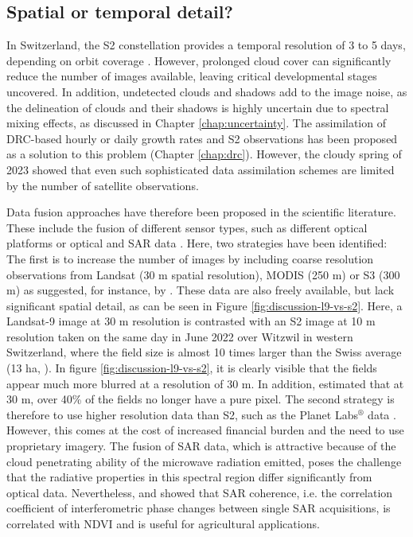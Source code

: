 \subsection{Spatial or temporal detail?}
In Switzerland, the \gls{S2} constellation provides a temporal resolution of 3 to 5 days, depending on orbit coverage \citep{pazur_national_2022}. However, prolonged cloud cover can significantly reduce the number of images available, leaving critical developmental stages uncovered. In addition, undetected clouds and shadows add to the image noise, as the delineation of clouds and their shadows is highly uncertain due to spectral mixing effects, as discussed in Chapter \ref{chap:uncertainty}. The assimilation of \gls{DRC}-based hourly or daily growth rates and \gls{S2} observations has been proposed as a solution to this problem (Chapter \ref{chap:drc}). However, the cloudy spring of 2023 showed that even such sophisticated data assimilation schemes are limited by the number of satellite observations.

Data fusion approaches have therefore been proposed in the scientific literature. These include the fusion of different sensor types, such as different optical platforms or optical and \gls{SAR} data \citep[for example]{pipia_fusing_2019, lobert_mowing_2021}. Here, two strategies have been identified: The first is to increase the number of images by including coarse resolution observations from Landsat (30 m spatial resolution), \gls{MODIS} (250 m) or \gls{S3} (300 m) as suggested, for instance, by \cite{zhou_reconstruction_2020}. These data are also freely available, but lack significant spatial detail, as can be seen in Figure \ref{fig:discussion-l9-vs-s2}. Here, a Landsat-9 image at 30 m resolution is contrasted with an S2 image at 10 m resolution taken on the same day in June 2022 over Witzwil in western Switzerland, where the field size is almost 10 times larger than the Swiss average (13 ha, \cite{perich_pixel-based_2023}). In figure \ref{fig:discussion-l9-vs-s2}, it is clearly visible that the fields appear much more blurred at a resolution of 30 m. In addition, \cite{meier_assessments_2020} estimated that at 30 m, over 40\% of the fields no longer have a pure pixel. The second strategy is therefore to use higher resolution data than \gls{S2}, such as the Planet Labs$^{\circledR}$ data \citep[for example]{sadeh_fusion_2021}. However, this comes at the cost of increased financial burden and the need to use proprietary imagery. The fusion of \gls{SAR} data, which is attractive because of the cloud penetrating ability of the microwave radiation emitted, poses the challenge that the radiative properties in this spectral region differ significantly from optical data. Nevertheless, \cite{bai_could_2020} and \cite{villarroya-carpio_sentinel-1_2022} showed that \gls{SAR} coherence, i.e. the correlation coefficient of interferometric phase changes between single \gls{SAR} acquisitions, is correlated with \gls{NDVI} and is useful for agricultural applications.

